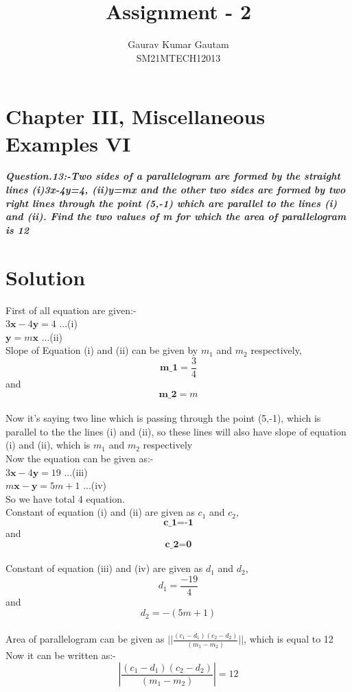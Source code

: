 \documentclass[journal,12pt,twocolumn]{IEEEtran}
\let\vec\mathbf
\begin{document}
\title{
Assignment - 2
}
\author{ Gaurav Kumar Gautam \\SM21MTECH12013}
\maketitle
\newpage
\bigskip

\section*{\textbf{Chapter III, Miscellaneous Examples VI}}
\noindent
\textbf{\textsl{Question.13:-Two sides of a parallelogram are formed by the straight lines (i)3x-4y=4, (ii)y=mx and the other two sides are formed by two right lines through the point (5,-1) which are parallel to the lines (i) and (ii). Find the two values of m for which the area of parallelogram is 12}}\\[6pt]

\section*{\textbf{Solution}}

First of all equation are given:- \\

$3\vec{x}-4\vec{y}=4$          ...(i)\\
$\vec{y}=m\vec{x}$             ...(ii)
\\

Slope of Equation (i) and (ii) can be given by $m_1$ and $m_2$ respectively,
$$\textbf{m_1}=\frac{3}{4}$$ and $$\textbf{m_2}=m$$\\
Now it's saying two line which is passing through the point (5,-1), which is parallel to the the lines (i) and (ii), so these lines will also have slope of equation (i) and (ii), which is $m_1$ and $m_2$ respectively\\
Now the equation can be given as:-\\[6pt]
$3\vec{x}-4\vec{y}=19$     ...(iii)\\
$m\vec{x}-\vec{y}=5m+1$    ...(iv)\\
So we have total 4 equation.\\
Constant of equation (i) and (ii) are given as $c_1$ and $c_2$,\\
$$\textbf{c_1=-1}$$ and $$\textbf{c_2=0}$$\\
Constant of equation (iii) and (iv) are given as $d_1$ and $d_2$,\\
$$d_1=\frac{-19}{4}$$ and $$d_2=-(5m+1)$$\\
Area of parallelogram can be given as $||\frac{(c_1-d_1)(c_2-d_2)}{(m_1-m_2)}||$, which is equal to 12\\
Now it can be written as:-\\
$$|\frac{(c_1-d_1)(c_2-d_2)}{(m_1-m_2)}|=12$$\\
\end{document}
